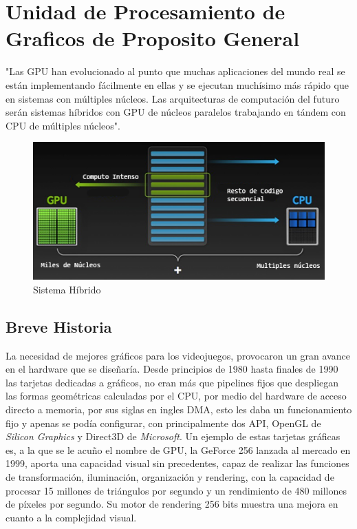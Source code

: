 \chapter{Unidad de Procesamiento de Graficos de Proposito General }

"Las GPU han evolucionado al punto que muchas aplicaciones del mundo real se están implementando fácilmente en ellas y se ejecutan muchísimo más rápido que en sistemas con múltiples núcleos. Las arquitecturas de computación del futuro serán sistemas híbridos con GPU de núcleos paralelos trabajando en tándem con CPU de múltiples núcleos".\cite{GPUIntro}

\begin{figure}[h]
			\centering
				\includegraphics[scale=1]{img/how-gpu-acceleration-works.png}
			\caption{Sistema Híbrido}
\end{figure}

\section{Breve Historia}
La necesidad de mejores gráficos para los videojuegos, provocaron un gran avance en el hardware que se diseñaría. Desde principios de 1980 hasta finales de 1990 las tarjetas dedicadas a gráficos, no eran más que pipelines fijos que despliegan las formas geométricas calculadas por el CPU, por medio del hardware de acceso directo a memoria, por sus siglas en ingles DMA, esto les daba un funcionamiento fijo y apenas se podía configurar, con principalmente dos API, OpenGL de \textit{Silicon Graphics} y Direct3D de \textit{Microsoft}. Un ejemplo de estas tarjetas gráficas es, a la que se le acuño el nombre de GPU, la GeForce 256\cite{GeForce256} lanzada al mercado en 1999, aporta una capacidad visual sin precedentes, capaz de realizar las funciones de  transformación, iluminación, organización y rendering, con la capacidad de procesar 15 millones de triángulos por segundo y un rendimiento de 480 millones de píxeles por segundo. Su motor de rendering  256 bits muestra una mejora en cuanto a la complejidad visual.

